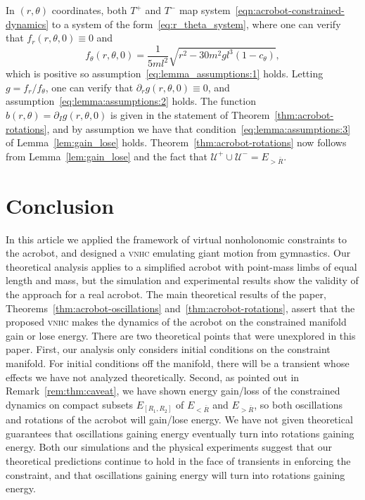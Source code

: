 \documentclass[journal,twoside,web, twocolumn]{ieeecolor}
\newcommand*{\cU}{\mathcal{U}}
\newcommand*{\vnhc}{\textsc{vnhc}\xspace}
\begin{document}
In $(r,\theta)$ coordinates, both $T^+$ and $T^-$ map
system~\eqref{eqn:acrobot-constrained-dynamics} to a system of the
form~\eqref{eq:r_theta_system}, where one can verify that
\(f_r(r,\theta,0) \equiv 0\) and
\[
 f_\theta(r,\theta,0) = \frac{1}{5ml^2} \sqrt{r^2 - 30m^2gl^3(1-c_\theta)}
,
\]
which is positive so assumption~\eqref{eq:lemma_assumptions:1} holds. Letting $g
= f_r / f _\theta$, one can verify that \(\partial_r g (r,\theta,0)
\equiv 0\), and assumption~\eqref{eq:lemma:assumptions:2} holds. The function
\(b(r,\theta) = \partial_I g(r,\theta,0)\) is given in the statement
of Theorem~\ref{thm:acrobot-rotations}, and by assumption we have that
condition~\eqref{eq:lemma:assumptions:3} of Lemma~\ref{lem:gain_lose} holds.
Theorem~\ref{thm:acrobot-rotations} now follows from  Lemma~\ref{lem:gain_lose}
and the fact that $\cU^+ \cup \cU^- = E_{>\bar R}$.
\hfill \QED

\section{Conclusion}\label{sec:conclusion}

In this article we applied the framework of virtual nonholonomic constraints to
the acrobot, and designed a \vnhc emulating giant motion from gymnastics. Our
theoretical analysis applies to a simplified acrobot with point-mass limbs of
equal length and mass, but the simulation and experimental results show the
validity of the approach for a real acrobot.  The main theoretical results of
the paper, Theorems~\ref{thm:acrobot-oscillations}
and~\ref{thm:acrobot-rotations}, assert that the proposed \vnhc makes the
dynamics of the acrobot on the constrained manifold gain or lose energy. There
are two theoretical points that were unexplored in this paper. First, our
analysis only considers initial conditions on the constraint manifold. For
initial conditions off the manifold, there will be a transient whose effects we
have not analyzed theoretically. Second, as pointed out in
Remark~\ref{rem:thm:caveat}, we have shown energy gain/loss of the constrained
dynamics on compact subsets $E_{[R_1,R_2]}$ of $E_{<\bar R}$ and $E_{>\bar R}$,
so both oscillations and rotations of the acrobot will gain/lose energy. We have
not given theoretical guarantees that oscillations gaining energy eventually
turn into rotations gaining energy.
Both our simulations and the physical experiments suggest that our theoretical
predictions continue to hold in the face of transients in enforcing the
constraint, and that oscillations gaining energy will turn into rotations
gaining energy.





\end{document}
